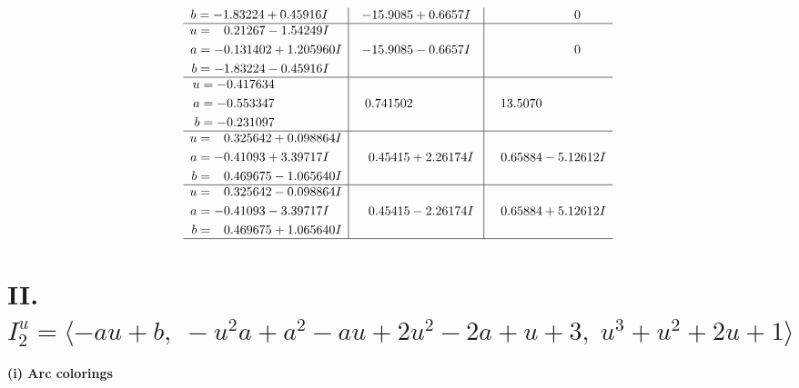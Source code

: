 \documentclass[1p]{elsarticle_modified}
\theoremstyle{definition}
\begin{document}
$$\begin{array}{c|c|c}
\begin{aligned}
b &= -1.83224 + 0.45916 I\end{aligned}
 & -15.9085 + 0.6657 I & \phantom{-0.000000 } 0 \\ \hline\begin{aligned}
u &= \phantom{-}0.21267 - 1.54249 I \\
a &= -0.131402 + 1.205960 I \\
b &= -1.83224 - 0.45916 I\end{aligned}
 & -15.9085 - 0.6657 I & \phantom{-0.000000 } 0 \\ \hline\begin{aligned}
u &= -0.417634\phantom{ +0.000000I} \\
a &= -0.553347\phantom{ +0.000000I} \\
b &= -0.231097\phantom{ +0.000000I}\end{aligned}
 & \phantom{-}0.741502\phantom{ +0.000000I} & \phantom{-}13.5070\phantom{ +0.000000I} \\ \hline\begin{aligned}
u &= \phantom{-}0.325642 + 0.098864 I \\
a &= -0.41093 + 3.39717 I \\
b &= \phantom{-}0.469675 - 1.065640 I\end{aligned}
 & \phantom{-}0.45415 + 2.26174 I & \phantom{-}0.65884 - 5.12612 I \\ \hline\begin{aligned}
u &= \phantom{-}0.325642 - 0.098864 I \\
a &= -0.41093 - 3.39717 I \\
b &= \phantom{-}0.469675 + 1.065640 I\end{aligned}
 & \phantom{-}0.45415 - 2.26174 I & \phantom{-}0.65884 + 5.12612 I\\
 \hline 
 \end{array}$$\newpage\newpage\renewcommand{\arraystretch}{1}
\centering \section*{II. $I^u_{2}= \langle - a u+b,\;- u^2 a+a^2- a u+2 u^2-2 a+u+3,\;u^3+u^2+2 u+1 \rangle$}
\flushleft \textbf{(i) Arc colorings}\\
\end{document}

